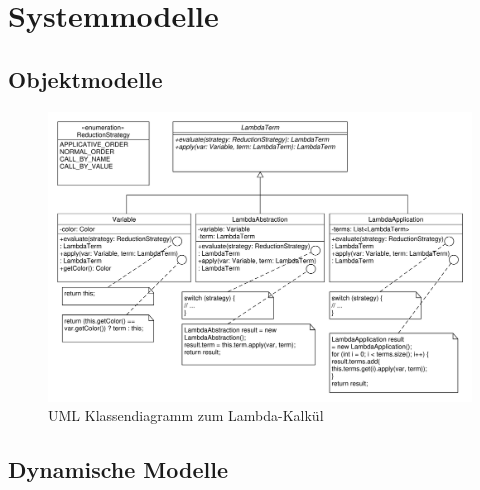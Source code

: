\section{Systemmodelle}

\subsection{Objektmodelle}

\begin{figure}[H]
\centering
\includegraphics[scale=0.5]{../system_models/object_models/lambda_calculus.pdf}
\caption{UML Klassendiagramm zum Lambda-Kalkül}
\end{figure}

\subsection{Dynamische Modelle}


